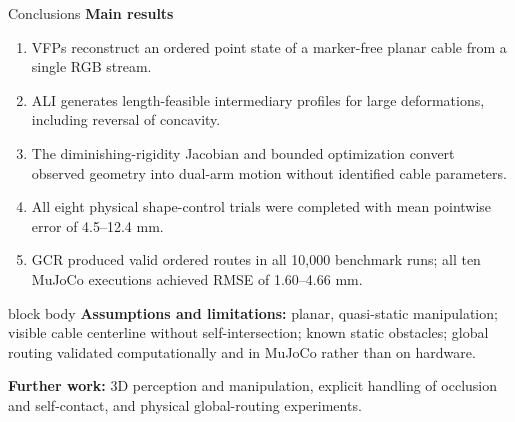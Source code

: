 \documentclass[aspectratio=169,10pt]{beamer}
\begin{document}
\begin{frame}[t]{Conclusions}
  \small
  \textbf{Main results}
  \begin{enumerate}
    \item VFPs reconstruct an ordered point state of a marker-free planar cable
      from a single RGB stream.
    \item ALI generates length-feasible intermediary profiles for large
      deformations, including reversal of concavity.
    \item The diminishing-rigidity Jacobian and bounded optimization convert
      observed geometry into dual-arm motion without identified cable parameters.
    \item All eight physical shape-control trials were completed with mean
      pointwise error of 4.5--12.4 mm.
    \item GCR produced valid ordered routes in all 10,000 benchmark runs; all
      ten MuJoCo executions achieved RMSE of 1.60--4.66 mm.
  \end{enumerate}

  \vspace{0.10cm}
  \begin{beamercolorbox}[wd=\textwidth,sep=0.11cm]{block body}
    \footnotesize
    \textbf{Assumptions and limitations:} planar, quasi-static manipulation;
    visible cable centerline without self-intersection; known static obstacles;
    global routing validated computationally and in MuJoCo rather than on hardware.
  \end{beamercolorbox}

  \vspace{0.12cm}
  \footnotesize
  \textbf{Further work:} 3D perception and manipulation, explicit handling of
  occlusion and self-contact, and physical global-routing experiments.
\end{frame}
\end{document}
